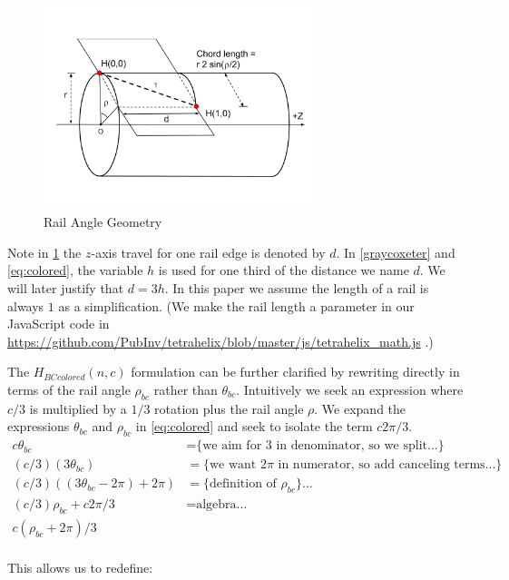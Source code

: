 \documentclass[review]{siamonline1116}
\begin{document}
\begin{figure}[H]
     \centering
     \includegraphics[width=0.7\textwidth]{figures/RailAngleGeometry.png}
     \caption{Rail Angle Geometry}
  \label{railanglefig}
\end{figure}

Note in \cref{railanglefig} the $z$-axis travel for one rail edge is denoted by $d$. In \eqref{graycoxeter} and \eqref{eq:colored}, the variable
$h$ is used for one third of the distance we name $d$. We will later justify that $d = 3h$.
In this paper we assume the length of a rail
is always $1$ as a simplification. (We make the rail length a parameter in our JavaScript code in
\url{https://github.com/PubInv/tetrahelix/blob/master/js/tetrahelix_math.js} \cite{readtetrahelix}.)

The $H_{BCcolored}(n,c)$ formulation can be further clarified by rewriting directly in terms of the rail angle $\rho_{bc}$ rather than $\theta_{bc}$.
Intuitively we seek an expression where $c/3$ is multiplied by a $1/3$ rotation plus the rail angle $\rho$.
We expand 
the expressions $\theta_{bc}$ and $\rho_{bc}$ in \eqref{eq:colored} and seek to isolate the term $c2\pi/3 $.
\begin{align*}
 c \theta_{bc}  &=   \text{\{we aim for 3 in denominator, so we split...\}} \\
    (c/3)  (3 \theta_{bc})  &=   \text{\{we want $2\pi$ in numerator, so add canceling terms...\}} \\
 (c/ 3) ((3 \theta_{bc} - 2 \pi)  + 2 \pi) &= \text{\{definition of $\rho_{bc}$\}...} \\  
  (c / 3) \rho_{bc}  + c 2 \pi /3 &=  \text{algebra...} \\  
c  ( \rho_{bc} +  2 \pi) /3  \\
\end{align*}

This allows us to redefine:
\end{document}
